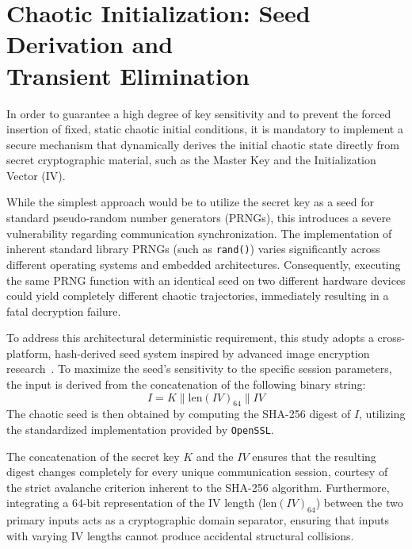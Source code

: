 \documentclass[11pt,a4paper]{report}
\begin{document}
\section[Chaotic Initialization: Seed Derivation and Transient Elimination]{Chaotic Initialization: Seed Derivation and \\ Transient Elimination}

In order to guarantee a high degree of key sensitivity and to prevent the forced insertion of fixed, static chaotic initial conditions, 
it is mandatory to implement a secure mechanism that dynamically derives the initial chaotic state directly from secret cryptographic material, such as the Master Key and the Initialization Vector (IV).

While the simplest approach would be to utilize the secret key as a seed for standard pseudo-random number generators (PRNGs), this introduces a severe vulnerability regarding communication synchronization. 
The implementation of inherent standard library PRNGs (such as \texttt{rand()}) varies significantly across different operating systems and embedded architectures. 
Consequently, executing the same PRNG function with an identical seed on two different hardware devices could yield completely different chaotic trajectories, immediately resulting in a fatal decryption failure.

To address this architectural deterministic requirement, this study adopts a cross-platform, hash-derived seed system inspired by advanced image encryption research~\cite{KeyAsSeed}. 
To maximize the seed's sensitivity to the specific session parameters, the input is derived from the concatenation of the following binary string:
\begin{equation}
    I = K \parallel \text{len}(IV)_{64} \parallel IV
\end{equation}
The chaotic seed is then obtained by computing the SHA-256 digest of $I$, utilizing the standardized implementation provided by \texttt{OpenSSL}. 

The concatenation of the secret key $K$ and the $IV$ ensures that the resulting digest changes completely for every unique communication session, courtesy of the strict avalanche criterion inherent to the SHA-256 algorithm. 
Furthermore, integrating a 64-bit representation of the IV length ($\text{len}(IV)_{64}$) between the two primary inputs acts as a cryptographic domain separator, ensuring that inputs with varying IV lengths cannot produce accidental structural collisions.
\end{document}
